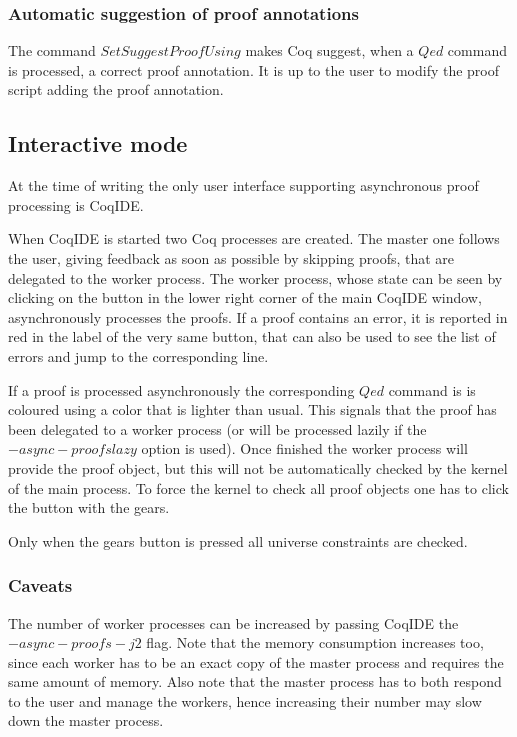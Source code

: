 \subsubsection{Automatic suggestion of proof annotations}

The command $Set Suggest Proof Using$ makes Coq suggest, when a $Qed$
command is processed, a correct proof annotation.  It is up to the user
to modify the proof script adding the proof annotation.

\subsection{Interactive mode}

At the time of writing the only user interface supporting asynchronous proof
processing is CoqIDE.  

When CoqIDE is started two Coq processes are created.  The master one follows
the user, giving feedback as soon as possible by skipping proofs, that are
delegated to the worker process.  The worker process, whose state can be seen
by clicking on the button in the lower right corner of the main CoqIDE window,
asynchronously processes the proofs.  If a proof contains an error, it is
reported in red in the label of the very same button, that can also be used to
see the list of errors and jump to the corresponding line.

If a proof is processed asynchronously the corresponding $Qed$ command is
is coloured using a color that is lighter than usual.  This signals that
the proof has been delegated to a worker process (or will be processed
lazily if the $-async-proofs lazy$ option is used).  Once finished the
worker process will provide the proof object, but this will not be
automatically checked by the kernel of the main process.  To force
the kernel to check all proof objects one has to click the button
with the gears.

Only when the gears button is pressed all universe constraints are checked.

\subsubsection{Caveats}
The number of worker processes can be increased by passing CoqIDE the
$-async-proofs-j 2$ flag.  Note that the memory consumption increases
too, since each worker has to be an exact copy of the master process
and requires the same amount of memory.  Also note that the master process
has to both respond to the user and manage the workers, hence increasing
their number may slow down the master process.

